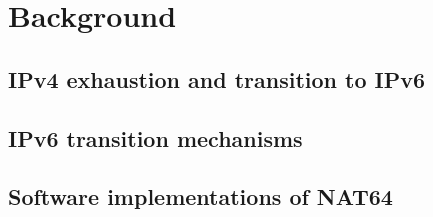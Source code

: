\chapter{Background}

\section{IPv4 exhaustion and transition to IPv6}

\section{IPv6 transition mechanisms}

\section{Software implementations of NAT64}